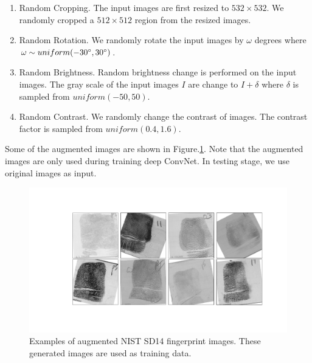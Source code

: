 \begin{enumerate}

	\item Random Cropping. The input images are first resized to $532 \times 532$. We randomly cropped a $512\times512$ region from the resized images.
	\item Random Rotation. We randomly rotate the input images by $\omega$ degrees where $\omega \sim uniform (-30\degree, 30\degree)$.
	\item Random Brightness.  Random brightness change is performed on the input images. The gray scale of the input images $I$ are change to $I + \delta$ where $\delta$ is  sampled from $uniform (-50, 50)$.
	\item Random Contrast. We randomly change the contrast of images. The contrast factor is sampled from $uniform (0.4, 1.6)$.

\end{enumerate}
Some of the augmented images are shown in Figure.\ref{fig.augmented_examples}. Note that the augmented images are only used during training deep ConvNet. In testing stage, we use original images as input.
\begin{figure}[!ht]
	\begin{center}
		\includegraphics[scale=0.33,clip=true,trim = 55mm 35mm 30mm 20mm]{fig/figs/augmented.pdf}
	\end{center}
	\caption{Examples of augmented NIST SD14 fingerprint images. These generated images are used as training data. } 
	\label{fig.augmented_examples}
\end{figure}

